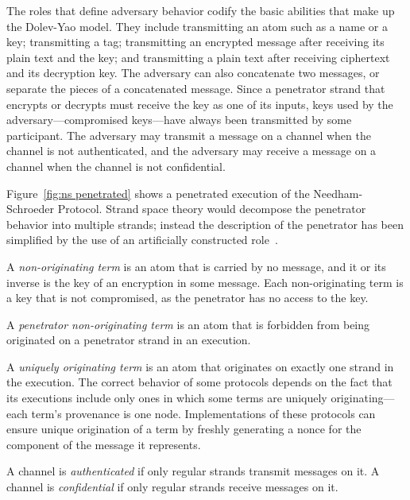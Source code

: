 \documentclass[12pt]{article}
\begin{document}
The roles that define adversary behavior codify the basic abilities
that make up the Dolev-Yao model.  They include transmitting an atom
such as a name or a key; transmitting a tag; transmitting an encrypted
message after receiving its plain text and the key; and transmitting a
plain text after receiving ciphertext and its decryption key.  The
adversary can also concatenate two messages, or separate the pieces of
a concatenated message.  Since a penetrator strand that encrypts or
decrypts must receive the key as one of its inputs, keys used by the
adversary---compromised keys---have always been transmitted by some
participant.  The adversary may transmit a message on a channel when
the channel is not authenticated, and the adversary may receive a
message on a channel when the channel is not confidential.

Figure~\ref{fig:ns penetrated} shows a penetrated execution of the
Needham-Schroeder Protocol.  Strand space theory would decompose the
penetrator behavior into multiple strands; instead the description of
the penetrator has been simplified by the use of an artificially
constructed role~.

A \emph{non-originating term} is an atom
that is carried by no message, and it or its inverse is the key of an
encryption in some message.  Each non-originating term is a key that
is not compromised, as the penetrator has no access to the key.

A \emph{penetrator non-originating
  term} is an atom that is forbidden from being originated on a
penetrator strand in an execution.

A \emph{uniquely originating term} is an
atom that originates on exactly one strand in the execution.  The
correct behavior of some protocols depends on the fact that its
executions include only ones in which some terms are uniquely
originating---each term's provenance is one node.  Implementations of
these protocols can ensure unique origination of a term by freshly
generating a nonce for the component of the message it represents.

A channel is \emph{authenticated} if
only regular strands transmit messages on it.
A channel is \emph{confidential} if
only regular strands receive messages on it.
\end{document}
